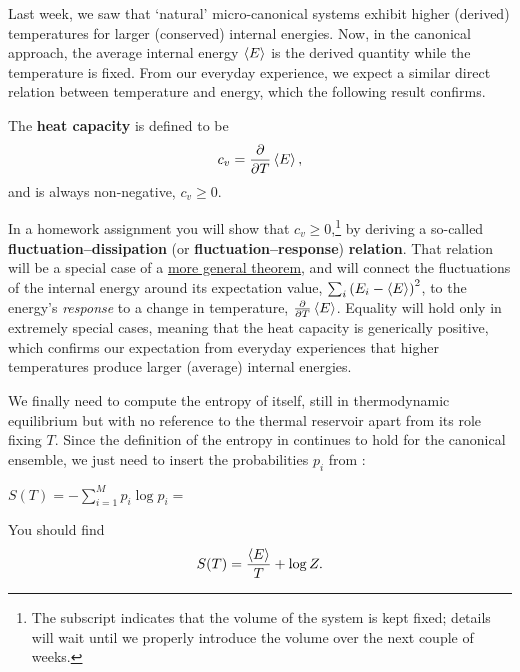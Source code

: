 Last week, we saw that `natural' micro-canonical systems exhibit higher (derived) temperatures for larger (conserved) internal energies.
Now, in the canonical approach, the average internal energy $\left\langle E \right\rangle$ is the derived quantity while the temperature is fixed.
From our everyday experience, we expect a similar direct relation between temperature and energy, which the following result confirms.

\begin{shaded}
  The \textbf{heat capacity} is defined to be
  \begin{equation}
    \label{eq:heat_cap}
    c_v = \frac{\partial }{\partial T} \left\langle E \right\rangle,
  \end{equation}
  and is always non-negative, $c_v \geq 0$.
\end{shaded}

In a homework assignment you will show that $c_v \geq 0$,\footnote{The subscript indicates that the volume of the system is kept fixed; details will wait until we properly introduce the volume over the next couple of weeks.} by deriving a so-called \textbf{fluctuation--dissipation} (or \textbf{fluctuation--response}) \textbf{relation}.
That relation will be a special case of a \href{https://en.wikipedia.org/wiki/Fluctuation-dissipation_theorem}{more general theorem}, and will connect the fluctuations of the internal energy around its expectation value, $\sum_i \left(E_i - \left\langle E \right\rangle\right)^2$, to the energy's \textit{response} to a change in temperature, $\frac{\partial }{\partial T} \left\langle E \right\rangle$.
Equality will hold only in extremely special cases, meaning that the heat capacity is generically positive, which confirms our expectation from everyday experiences that higher temperatures produce larger (average) internal energies.

\newpage %
We finally need to compute the entropy of \Om itself, still in thermodynamic equilibrium but with no reference to the thermal reservoir apart from its role fixing $T$.
Since the definition of the entropy in  continues to hold for the canonical ensemble, we just need to insert the probabilities $p_i$ from :
\begin{mdframed}
  $\displaystyle S(T) = -\sum_{i = 1}^M p_i \log p_i = $ \\[100 pt]
\end{mdframed}
You should find
\begin{equation}
  \label{eq:canon_entropy}
  S(T) = \frac{\left\langle E \right\rangle}{T} + \log Z.
\end{equation}



